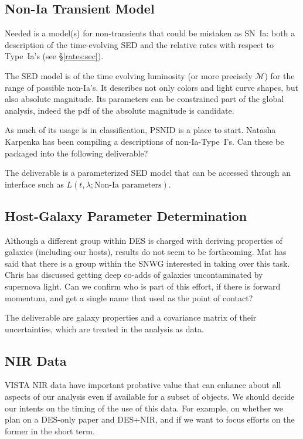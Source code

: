 \documentclass[preprint,3p]{elsarticle}
\begin{document}
\subsection{Non-Ia Transient Model}
Needed is a model(s) for non-transients that could be mistaken as SN~Ia:
both a description of the time-evolving SED and the relative rates
with respect to Type~Ia's (see \S\ref{rates:sec}).

The SED model is of the time evolving luminosity (or more precisely $\mathcal{M}$)
for the range of possible non-Ia's.  It describes not only colors and light curve shapes,
but also absolute magnitude.  Its parameters can be constrained part of the
global analysis, indeed the pdf of the absolute magnitude is candidate.

As much of its usage is in classification, PSNID is a place to start.
Natasha Karpenka has been compiling a descriptions of non-Ia-Type~I's.  Can these
be packaged into the following deliverable?

The deliverable is a parameterized SED model that can be accessed through
an interface such as $L(t,\lambda; \text{Non-Ia parameters})$. 

\subsection{Host-Galaxy Parameter Determination}
Although a different group within DES is charged with deriving properties
of galaxies (including our hosts), results do not seem to be forthcoming.
Mat has said that there is a group within the SNWG interested in
taking over this task.  Chris has discussed getting deep
co-adds of galaxies uncontaminated by supernova light.
Can we confirm who is part of this effort, if there is forward momentum,
and get a single name that used as the point of contact?

The deliverable are galaxy properties and a covariance matrix of their uncertainties,
which are treated in the analysis as data.

\subsection{NIR Data}
VISTA NIR data have important probative value that can enhance about all aspects
of our analysis even if available for a subset of objects.
We should decide our intents on the timing of the use of this data.
For example, on whether we plan on a DES-only paper and DES+NIR, and if
we want to focus efforts on the former in the short term.
\end{document}
